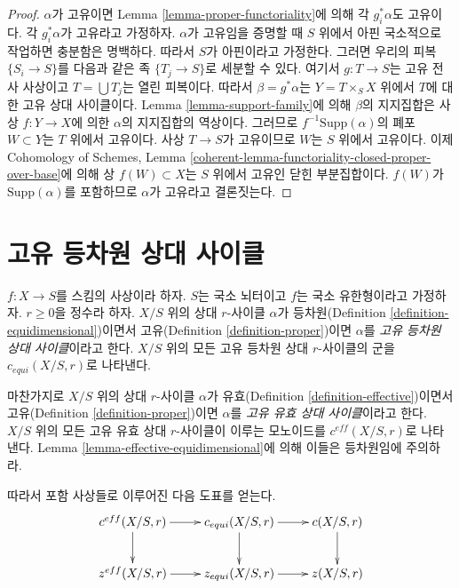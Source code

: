 \begin{proof}
$\alpha$가 고유이면 Lemma \ref{lemma-proper-functoriality}에 의해 각
$g_i^*\alpha$도 고유이다. 각 $g_i^*\alpha$가 고유라고 가정하자.
$\alpha$가 고유임을 증명할 때 $S$ 위에서 아핀 국소적으로 작업하면
충분함은 명백하다. 따라서 $S$가 아핀이라고 가정한다. 그러면 우리의
피복 $\{S_i \to S\}$를 다음과 같은 족 $\{T_j \to S\}$로 세분할 수
있다. 여기서 $g : T \to S$는 고유 전사 사상이고
$T = \bigcup T_j$는 열린 피복이다. 따라서 $\beta = g^*\alpha$는
$Y = T \times_S X$ 위에서 $T$에 대한 고유 상대 사이클이다. Lemma
\ref{lemma-support-family}에 의해 $\beta$의 지지집합은 사상
$f : Y \to X$에 의한 $\alpha$의 지지집합의 역상이다. 그러므로
$f^{-1}\text{Supp}(\alpha)$의 폐포 $W \subset Y$는 $T$ 위에서
고유이다. 사상 $T \to S$가 고유이므로 $W$는 $S$ 위에서 고유이다.
이제 Cohomology of Schemes, Lemma
\ref{coherent-lemma-functoriality-closed-proper-over-base}에 의해 상
$f(W) \subset X$는 $S$ 위에서 고유인 닫힌 부분집합이다. $f(W)$가
$\text{Supp}(\alpha)$를 포함하므로 $\alpha$가 고유라고 결론짓는다.
\end{proof}



\section{고유 등차원 상대 사이클}
\label{section-proper-equidimensional}

\noindent
$f : X \to S$를 스킴의 사상이라 하자. $S$는 국소 뇌터이고 $f$는
국소 유한형이라고 가정하자. $r \geq 0$을 정수라 하자. $X/S$ 위의
상대 $r$-사이클 $\alpha$가 등차원(Definition
\ref{definition-equidimensional})이면서 고유(Definition
\ref{definition-proper})이면 $\alpha$를 {\it 고유 등차원 상대 사이클}이라고
한다. $X/S$ 위의 모든 고유 등차원 상대 $r$-사이클의 군을
$c_{equi}(X/S, r)$로 나타낸다.

\medskip\noindent
마찬가지로 $X/S$ 위의 상대 $r$-사이클 $\alpha$가 유효(Definition
\ref{definition-effective})이면서 고유(Definition
\ref{definition-proper})이면 $\alpha$를 {\it 고유 유효 상대 사이클}이라고
한다. $X/S$ 위의 모든 고유 유효 상대 $r$-사이클이 이루는 모노이드를
$c^{eff}(X/S, r)$로 나타낸다. Lemma
\ref{lemma-effective-equidimensional}에 의해 이들은 등차원임에
주의하라.

\medskip\noindent
따라서 포함 사상들로 이루어진 다음 도표를 얻는다.
$$
\xymatrix{
c^{eff}(X/S, r) \ar[r] \ar[d] &
c_{equi}(X/S, r) \ar[r] \ar[d] &
c(X/S, r) \ar[d] \\
z^{eff}(X/S, r) \ar[r] &
z_{equi}(X/S, r) \ar[r] &
z(X/S, r)
}
$$



